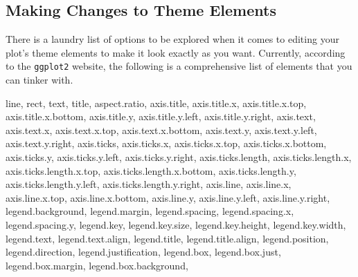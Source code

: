 \documentclass[
  letterpaper,
]{krantz}
\newenvironment{Shaded}{\begin{snugshade}}{\end{snugshade}}
\newcommand{\NormalTok}[1]{\textcolor[rgb]{0.00,0.23,0.31}{#1}}
\begin{document}
\hypertarget{making-changes-to-theme-elements}{%
\subsection{Making Changes to Theme
Elements}\label{making-changes-to-theme-elements}}

There is a laundry list of options to be explored when it comes to
editing your plot's theme elements to make it look exactly as you want.
Currently, according to the \texttt{ggplot2} website, the following is a
comprehensive list of elements that you can tinker with.

\begin{Shaded}
\begin{Highlighting}[]
\NormalTok{  line,}
\NormalTok{  rect,}
\NormalTok{  text,}
\NormalTok{  title,}
\NormalTok{  aspect.ratio,}
\NormalTok{  axis.title,}
\NormalTok{  axis.title.x,}
\NormalTok{  axis.title.x.top,}
\NormalTok{  axis.title.x.bottom,}
\NormalTok{  axis.title.y,}
\NormalTok{  axis.title.y.left,}
\NormalTok{  axis.title.y.right,}
\NormalTok{  axis.text,}
\NormalTok{  axis.text.x,}
\NormalTok{  axis.text.x.top,}
\NormalTok{  axis.text.x.bottom,}
\NormalTok{  axis.text.y,}
\NormalTok{  axis.text.y.left,}
\NormalTok{  axis.text.y.right,}
\NormalTok{  axis.ticks,}
\NormalTok{  axis.ticks.x,}
\NormalTok{  axis.ticks.x.top,}
\NormalTok{  axis.ticks.x.bottom,}
\NormalTok{  axis.ticks.y,}
\NormalTok{  axis.ticks.y.left,}
\NormalTok{  axis.ticks.y.right,}
\NormalTok{  axis.ticks.length,}
\NormalTok{  axis.ticks.length.x,}
\NormalTok{  axis.ticks.length.x.top,}
\NormalTok{  axis.ticks.length.x.bottom,}
\NormalTok{  axis.ticks.length.y,}
\NormalTok{  axis.ticks.length.y.left,}
\NormalTok{  axis.ticks.length.y.right,}
\NormalTok{  axis.line,}
\NormalTok{  axis.line.x,}
\NormalTok{  axis.line.x.top,}
\NormalTok{  axis.line.x.bottom,}
\NormalTok{  axis.line.y,}
\NormalTok{  axis.line.y.left,}
\NormalTok{  axis.line.y.right,}
\NormalTok{  legend.background,}
\NormalTok{  legend.margin,}
\NormalTok{  legend.spacing,}
\NormalTok{  legend.spacing.x,}
\NormalTok{  legend.spacing.y,}
\NormalTok{  legend.key,}
\NormalTok{  legend.key.size,}
\NormalTok{  legend.key.height,}
\NormalTok{  legend.key.width,}
\NormalTok{  legend.text,}
\NormalTok{  legend.text.align,}
\NormalTok{  legend.title,}
\NormalTok{  legend.title.align,}
\NormalTok{  legend.position,}
\NormalTok{  legend.direction,}
\NormalTok{  legend.justification,}
\NormalTok{  legend.box,}
\NormalTok{  legend.box.just,}
\NormalTok{  legend.box.margin,}
\NormalTok{  legend.box.background,}

\end{Highlighting}
\end{Shaded}
\end{document}
